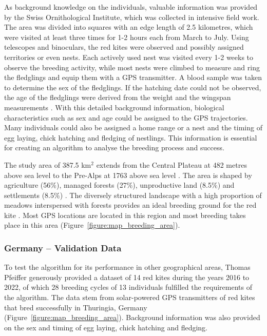As background knowledge on the individuals, valuable information was provided by the Swiss Ornithological Institute, which was collected in intensive field work. The area was divided into squares with an edge length of 2.5 kilometres, which were visited at least three times for 1-2 hours each from March to July. Using telescopes and binoculars, the red kites were observed and possibly assigned territories or even nests. Each actively used nest was visited every 1-2 weeks to observe the breeding activity, while most nests were climbed to measure and ring the fledglings and equip them with a GPS transmitter. A blood sample was taken to determine the sex of the fledglings. If the hatching date could not be observed, the age of the fledglings were derived from the weight and the wingspan measurements \parencite{scherler2023brutbiologie}. With this detailed background information, biological characteristics such as sex and age could be assigned to the GPS trajectories. Many individuals could also be assigned a home range or a nest and the timing of egg laying, chick hatching and fledging of nestlings. This information is essential for creating an algorithm to analyse the breeding process and success.

The study area of 387.5 km$^2$ extends from the Central Plateau at 482 metres above sea level to the Pre-Alps at 1763 above sea level \parencite{scherler2023brutbiologie}. The area is shaped by agriculture (56\%), managed forests (27\%), unproductive land (8.5\%) and settlements (8.5\%) \parencite{naegeli2021weather}. The diversely structured landscape with a high proportion of meadows interspersed with forests provides an ideal breeding ground for the red kite \parencite{aebischer2021rotmilan}. Most GPS locations are located in this region and most breeding takes place in this area (Figure~\ref{figure:map_breeding_area}).

\subsubsection{Germany -- Validation Data}
To test the algorithm for its performance in other geographical areas, Thomas Pfeiffer generously provided a dataset of 14 red kites during the years 2016 to 2022, of which 28 breeding cycles of 13 individuals fulfilled the requirements of the algorithm. The data stem from solar-powered GPS transmitters of red kites that bred successfully in Thuringia, Germany (Figure~\ref{figure:map_breeding_area}). Background information was also provided on the sex and timing of egg laying, chick hatching and fledging.


